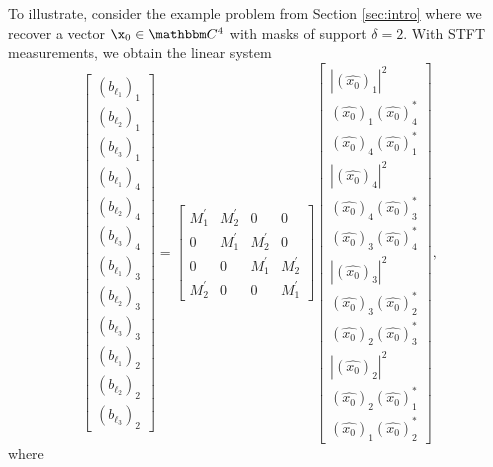 To illustrate, consider the example problem from
Section \ref{sec:intro} where we recover a vector $\x_0 \in \mathbbm C^4$
with masks of support $\delta=2$. With STFT measurements, we obtain the
linear system 
%
\begin{equation} 
\begin{bmatrix}
  (b_{\ell_1})_1 \\  (b_{\ell_2})_1 \\ (b_{\ell_3})_1 \\ 
  (b_{\ell_1})_4 \\  (b_{\ell_2})_4 \\ (b_{\ell_3})_4 \\
  (b_{\ell_1})_3 \\  (b_{\ell_2})_3 \\ (b_{\ell_3})_3 \\
  (b_{\ell_1})_2 \\  (b_{\ell_2})_2 \\ (b_{\ell_3})_2
\end{bmatrix} =
%
\begin{bmatrix}
        M_1^\prime & M_2^\prime & 0 & 0 \\
        0 & M_1^\prime & M_2^\prime & 0 \\
        0 & 0 & M_1^\prime & M_2^\prime \\
        M_2^\prime & 0 & 0 & M_1^\prime 
\end{bmatrix}
%
\begin{bmatrix}
  |(\widehat{x_0})_1|^2 \\ 
    (\widehat{x_0})_1 (\widehat{x_0})_4^* \\ 
    (\widehat{x_0})_4 (\widehat{x_0})_1^* \\ 
  |(\widehat{x_0})_4|^2 \\
    (\widehat{x_0})_4 (\widehat{x_0})_3^* \\ 
    (\widehat{x_0})_3 (\widehat{x_0})_4^* \\ 
  |(\widehat{x_0})_3|^2 \\ 
    (\widehat{x_0})_3 (\widehat{x_0})_2^* \\ 
    (\widehat{x_0})_2 (\widehat{x_0})_3^* \\ 
  |(\widehat{x_0})_2|^2 \\ 
    (\widehat{x_0})_2 (\widehat{x_0})_1^* \\ 
    (\widehat{x_0})_1 (\widehat{x_0})_2^*
\end{bmatrix},   
\label{eq:toyProb}
\end{equation}
%
where 
%
